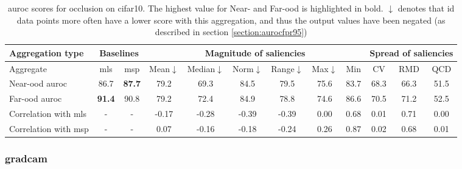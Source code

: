 \documentclass[UKenglish]{uiomasterthesis} %
\theoremstyle{definition}
\begin{document}
\begin{table}[H]
\setlength\tabcolsep{4pt}
\begin{center}
\begin{tabular}{ |m{5em}|c c|c c c c c c|c c c| }
    \hline
     Aggregation type & \multicolumn{2}{c|}{Baselines} & \multicolumn{6}{c|}{Magnitude of saliencies} & \multicolumn{3}{c|}{Spread of saliencies} \\
    \hline
    Aggregate & \ac{mls} & \ac{msp} & Mean$\downarrow$ & Median$\downarrow$ & Norm$\downarrow$ & Range$\downarrow$ & Max$\downarrow$ & Min & CV & RMD & QCD  \\
    \hline
    \rowcolor{near!50}
    Near-\ac{ood} \ac{auroc} & 86.7 &\textbf{ 87.7 }& 79.2 & 69.3 & 84.5 & 79.5 & 75.6 & 83.7 & 68.3 & 66.3 & 51.5  \\
    \hline
    \rowcolor{far!50}
    Far-\ac{ood} \ac{auroc} &\textbf{ 91.4 }& 90.8 & 79.2 & 72.4 & 84.9 & 78.8 & 74.6 & 86.6 & 70.5 & 71.2 & 52.5  \\
    \hline
    Correlation with \ac{mls}& - & - & -0.17 & -0.28 & -0.39 & -0.39 & 0.00 & 0.68 & 0.01 & 0.71 & 0.00  \\
    \hline
    Correlation with \ac{msp}& - & - & 0.07 & -0.16 & -0.18 & -0.24 & 0.26 & 0.87 & 0.02 & 0.68 & 0.01  \\
    \hline
    \end{tabular}
    \caption{\ac{auroc} scores for occlusion on cifar10. The highest value for Near- and Far-\ac{ood} is highlighted in bold. $\downarrow$ denotes that \ac{id} data points more often have a lower score with this aggregation, and thus the output values have been negated (as described in section \ref{section:aurocfpr95})}
    \label{table:cifar10_occlusion_metrics}
\end{center}
\setlength\tabcolsep{6pt}
\end{table}

\subsubsection{\ac{gradcam}}
\end{document}
